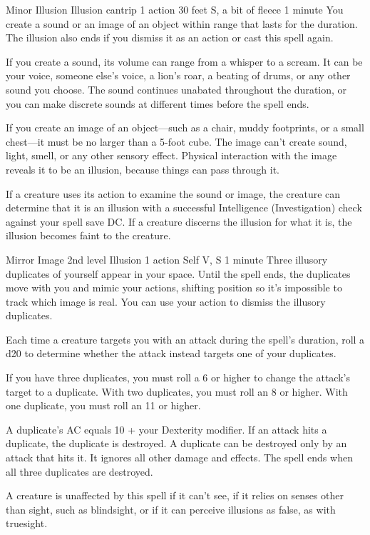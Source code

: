 \documentclass[10pt,a4paper,twoside,bg=print,twocolumn,openany,nodeprecatedcode]{dndbook}
\begin{document}
\DndSpellHeader%
{Minor Illusion}
{Illusion cantrip}
{1 action}
{30 feet}
{S, a bit of fleece}
{1 minute}
You create a sound or an image of an object within range that lasts for the duration. The illusion also ends if you dismiss it as an action or cast this spell again.

If you create a sound, its volume can range from a whisper to a scream. It can be your voice, someone else's voice, a lion's roar, a beating of drums, or any other sound you choose. The sound continues unabated throughout the duration, or you can make discrete sounds at different times before the spell ends.

If you create an image of an object—such as a chair, muddy footprints, or a small chest—it must be no larger than a 5-foot cube. The image can't create sound, light, smell, or any other sensory effect. Physical interaction with the image reveals it to be an illusion, because things can pass through it.

If a creature uses its action to examine the sound or image, the creature can determine that it is an illusion with a successful Intelligence (Investigation) check against your spell save DC. If a creature discerns the illusion for what it is, the illusion becomes faint to the creature.



\DndSpellHeader%
{Mirror Image}
{2nd level Illusion}
{1 action}
{Self}
{V, S}
{1 minute}
Three illusory duplicates of yourself appear in your space. Until the spell ends, the duplicates move with you and mimic your actions, shifting position so it's impossible to track which image is real. You can use your action to dismiss the illusory duplicates.

Each time a creature targets you with an attack during the spell's duration, roll a d20 to determine whether the attack instead targets one of your duplicates.

If you have three duplicates, you must roll a 6 or higher to change the attack's target to a duplicate. With two duplicates, you must roll an 8 or higher. With one duplicate, you must roll an 11 or higher.

A duplicate's AC equals 10 + your Dexterity modifier. If an attack hits a duplicate, the duplicate is destroyed. A duplicate can be destroyed only by an attack that hits it. It ignores all other damage and effects. The spell ends when all three duplicates are destroyed.

A creature is unaffected by this spell if it can't see, if it relies on senses other than sight, such as blindsight, or if it can perceive illusions as false, as with truesight.
\end{document}
